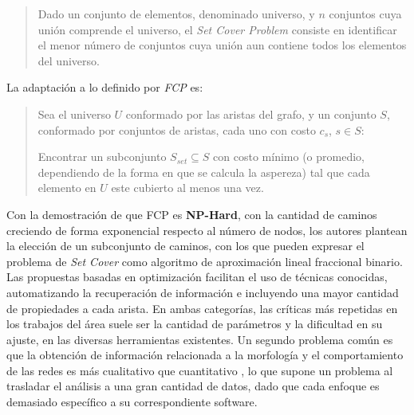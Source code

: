 \documentclass{article}
\begin{document}
\begin{quote}
Dado un conjunto de elementos, denominado universo, y $n$ conjuntos cuya unión comprende el universo, el {\it Set Cover Problem} consiste en identificar el menor n\'umero de conjuntos cuya unión aun contiene todos los elementos del universo.
\end{quote}

La adaptaci\'on a lo definido por {\it FCP} es: 
\begin{quote}
Sea el universo $U$ conformado por las aristas del grafo, y un conjunto $S$, conformado por conjuntos de aristas, cada uno con costo $c_s$, $s \in S$:

Encontrar un subconjunto $S_{set} \subseteq S$ con costo m\'inimo (o promedio, dependiendo de la forma en que se calcula la aspereza) tal que cada elemento en $U$ este cubierto al menos una vez.
\end{quote}

Con la demostraci\'on de que FCP es {\bf NP-Hard}, con la cantidad de caminos creciendo de forma exponencial respecto al n\'umero de nodos, los autores plantean la elecci\'on de un subconjunto de caminos, con los que pueden expresar el problema de {\it Set Cover} como algoritmo de aproximaci\'on lineal fraccional binario.
\medskip
\noindent
Las propuestas basadas en optimizaci\'on facilitan el uso de t\'ecnicas conocidas, automatizando la recuperaci\'on de informaci\'on e incluyendo una mayor cantidad de propiedades a cada arista.
En ambas categor\'ias, las cr\'iticas m\'as repetidas en los trabajos del \'area suele ser la cantidad de par\'ametros y la dificultad en su ajuste, en las diversas herramientas existentes. Un segundo problema com\'un es que la obtenci\'on de informaci\'on relacionada a la morfolog\'ia y el comportamiento de las redes es m\'as cualitativo que cuantitativo \cite{asgharzadeh2018computational}\cite{qiu2014quantitative}, lo que supone un problema al trasladar el  an\'alisis a una gran cantidad de datos, dado que cada enfoque es demasiado espec\'ifico a su correspondiente software.
\end{document}
